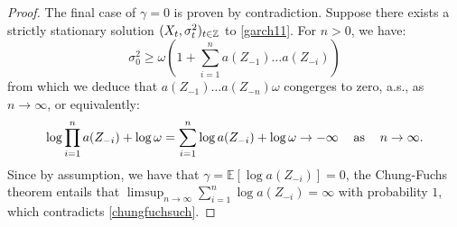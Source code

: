 \begin{proof}
The final case of $\gamma=0$ is proven by contradiction. Suppose there exists a strictly stationary solution $(X_{t},\sigma_{t}^{2})_{t\in\mathbb{Z}}$ to \eqref{garch11}. For $n>0$, we have:
\begin{equation}
    \sigma_{0}^{2}\geq\omega\left(1+\sum_{i=1}^{n}a(Z_{-1})\dots a(Z_{-i})\right)
\end{equation}
from which we deduce that $a(Z_{-1})\dots a(Z_{-n})\omega$ congerges to zero, a.s., as $n\to\infty$, or equivalently:
\begin{equation}\label{chungfuchsuch}
    \log \prod_{i=1}^{n}a(Z_{-i})+\log \omega=\sum_{i=1}^{n}\log a(Z_{-i})+\log\omega\to -\infty\hspace{12 pt}\textrm{as}\hspace{12 pt} n\to\infty.
\end{equation}
Since by assumption, we have that $\gamma=\mathbb{E}[\log a(Z_{-i})]=0$, the Chung-Fuchs theorem entails that $\limsup_{n\to\infty}\sum_{i=1}^{n}\log a(Z_{-i})=\infty$ with probability $1$, which contradicts \eqref{chungfuchsuch}. %
\end{proof}

